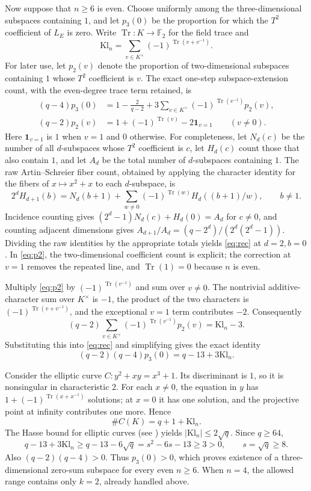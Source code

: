 \documentclass[11pt]{amsart}
\begin{document}
Now suppose that $n\ge6$ is even. Choose uniformly among the three-dimensional subspaces containing $1$, and let $p_3(0)$ be the proportion for which the $T^2$ coefficient of $L_E$ is zero. Write $\operatorname{Tr}:K\to\mathbb F_2$ for the field trace and
\[
\mathrm{Kl}_n=\sum_{v\in K^\times}(-1)^{\operatorname{Tr}(v+v^{-1})}.
\]
For later use, let $p_2(v)$ denote the proportion of two-dimensional subspaces containing $1$ whose $T^2$ coefficient is $v$. The exact one-step subspace-extension count, with the even-degree trace term retained, is
\begin{align}
(q-4)p_3(0)&=1-\frac{2}{q-2}+3\sum_{v\in K^\times}(-1)^{\operatorname{Tr}(v^{-1})}p_2(v),\label{eq:rec}\\
(q-2)p_2(v)&=1+(-1)^{\operatorname{Tr}(v)}-2\mathbf 1_{v=1} \qquad(v\ne0).\label{eq:p2}
\end{align}
Here $\mathbf 1_{v=1}$ is $1$ when $v=1$ and $0$ otherwise. For completeness, let $N_d(c)$ be the number of all $d$-subspaces whose $T^2$ coefficient is $c$, let $H_d(c)$ count those that also contain $1$, and let $A_d$ be the total number of $d$-subspaces containing $1$. The raw Artin--Schreier fiber count, obtained by applying the character identity for the fibers of $x\mapsto x^2+x$ to each $d$-subspace, is
\[
2^d H_{d+1}(b)=N_d(b+1)+\sum_{w\ne0}(-1)^{\operatorname{Tr}(w)}H_d((b+1)/w),\qquad b\ne1.
\]
Incidence counting gives $(2^d-1)N_d(c)+H_d(0)=A_d$ for $c\ne0$, and counting adjacent dimensions gives $A_{d+1}/A_d=(q-2^d)/(2^d(2^d-1))$. Dividing the raw identities by the appropriate totals yields \eqref{eq:rec} at $d=2,b=0$. In \eqref{eq:p2}, the two-dimensional coefficient count is explicit; the correction at $v=1$ removes the repeated line, and $\operatorname{Tr}(1)=0$ because $n$ is even.

Multiply \eqref{eq:p2} by $(-1)^{\operatorname{Tr}(v^{-1})}$ and sum over $v\ne0$. The nontrivial additive-character sum over $K^\times$ is $-1$, the product of the two characters is $(-1)^{\operatorname{Tr}(v+v^{-1})}$, and the exceptional $v=1$ term contributes $-2$. Consequently
\[
(q-2)\sum_{v\in K^\times}(-1)^{\operatorname{Tr}(v^{-1})}p_2(v)=\mathrm{Kl}_n-3.
\]
Substituting this into \eqref{eq:rec} and simplifying gives the exact identity
\[
(q-2)(q-4)p_3(0)=q-13+3\mathrm{Kl}_n.
\]

Consider the elliptic curve $C:y^2+xy=x^3+1$. Its discriminant is $1$, so it is nonsingular in characteristic $2$. For each $x\ne0$, the equation in $y$ has $1+(-1)^{\operatorname{Tr}(x+x^{-1})}$ solutions; at $x=0$ it has one solution, and the projective point at infinity contributes one more. Hence
\[
\#C(K)=q+1+\mathrm{Kl}_n.
\]
The Hasse bound for elliptic curves (see \cite{Silverman}) yields $|\mathrm{Kl}_n|\le2\sqrt q$. Since $q\ge64$,
\[
q-13+3\mathrm{Kl}_n\ge q-13-6\sqrt q=s^2-6s-13\ge3>0,
\qquad s=\sqrt q\ge8.
\]
Also $(q-2)(q-4)>0$. Thus $p_3(0)>0$, which proves existence of a three-dimensional zero-sum subspace for every even $n\ge6$. When $n=4$, the allowed range contains only $k=2$, already handled above.
\end{document}
